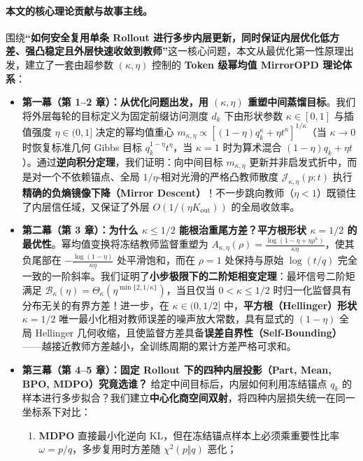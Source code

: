 \documentclass[lang=cn,scheme=chinese,openany]{../book/elegantbook}
\begin{document}
\paragraph{本文的核心理论贡献与故事主线。}
围绕\textbf{“如何安全复用单条 Rollout 进行多步内层更新，同时保证内层优化低方差、强凸稳定且外层快速收敛到教师”}这一核心问题，本文从最优化第一性原理出发，建立了一套由超参数 $(\kappa,\eta)$ 控制的 \textbf{Token 级幂均值 MirrorOPD 理论体系}：
\begin{itemize}
\item \textbf{第一幕（第 1--2 章）：从优化问题出发，用 $(\kappa,\eta)$ 重塑中间蒸馏目标}。我们将外层每轮的目标定义为固定前缀访问测度 $d_k$ 下由形状参数 $\kappa\in[0,1]$ 与插值强度 $\eta\in(0,1]$ 决定的幂均值重心 $m_{\kappa,\eta}\propto[(1-\eta)q_k^\kappa+\eta t^\kappa]^{1/\kappa}$（当 $\kappa\to 0$ 时恢复标准几何 Gibbs 目标 $q_k^{1-\eta}t^\eta$，当 $\kappa=1$ 时为算术混合 $(1-\eta)q_k+\eta t$）。通过\textbf{逆向积分定理}，我们证明：向中间目标 $m_{\kappa,\eta}$ 更新并非启发式折中，而是对一个不依赖锚点、全局 $1/\eta$-相对光滑的严格凸教师散度 $\mathcal J_{\kappa,\eta}(p;t)$ 执行\textbf{精确的负熵镜像下降（Mirror Descent）}！不一步跳向教师（$\eta<1$）既锁住了内层信任域，又保证了外层 $O(1/(\eta K_{\mathrm{out}}))$ 的全局收敛率。
\item \textbf{第二幕（第 3 章）：为什么 $\kappa\le 1/2$ 能根治重尾方差？平方根形状 $\kappa=1/2$ 的最优性}。幂均值变换将冻结教师监督重塑为 $A_{\kappa,\eta}(\rho)=\frac{\log(1-\eta+\eta\rho^\kappa)}{\kappa\eta}$，使其负尾部在 $-\frac{\log(1-\eta)}{\kappa\eta}$ 处平滑饱和，而在 $\rho=1$ 处保持与原始 $\log(t/q)$ 完全一致的一阶斜率。我们证明了\textbf{小步极限下的二阶矩相变定理}：最坏信号二阶矩满足 $\mathcal B_\kappa(\eta)=\Theta_\kappa(\eta^{\min\{2,1/\kappa\}})$，当且仅当 $0<\kappa\le 1/2$ 时归一化监督具有分布无关的有界方差！进一步，在 $\kappa\in(0,1/2]$ 中，\textbf{平方根（Hellinger）形状 $\kappa=1/2$} 唯一最小化相对教师误差的噪声放大常数，具有显式的 $(1-\eta)$ 全局 Hellinger 几何收缩，且使监督方差具备\textbf{误差自界性（Self-Bounding）}——越接近教师方差越小，全训练周期的累计方差严格可求和。
\item \textbf{第三幕（第 4--5 章）：固定 Rollout 下的四种内层投影（Part, Mean, BPO, MDPO）究竟选谁？} 给定中间目标后，内层如何利用冻结锚点 $q_k$ 的样本进行多步拟合？我们建立\textbf{中心化商空间双射}，将四种内层损失统一在同一坐标系下对比：
  \begin{enumerate}
  \item \textbf{MDPO} 直接最小化逆向 KL，但在冻结锚点样本上必须乘重要性比率 $\omega=p/q$，多步复用时方差随 $\chi^2(p\Vert q)$ 恶化；

\end{enumerate}
\end{itemize}
\end{document}
